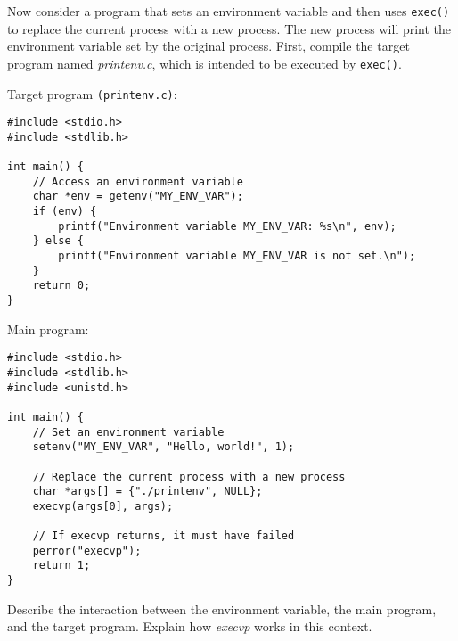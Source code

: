 \documentclass{dcbl/challenge}
\begin{document}
\begin{aufgabe}
Now consider a program that sets an environment variable and then uses \texttt{exec()} to replace the current process with a new process. The new process will print the environment variable set by the original process. First, compile the target program named \textit{printenv.c}, which is intended to be executed by \texttt{exec()}. 

Target program \texttt{(printenv.c)}:

\begin{verbatim}
#include <stdio.h>
#include <stdlib.h>

int main() {
    // Access an environment variable
    char *env = getenv("MY_ENV_VAR");
    if (env) {
        printf("Environment variable MY_ENV_VAR: %s\n", env);
    } else {
        printf("Environment variable MY_ENV_VAR is not set.\n");
    }
    return 0;
}
\end{verbatim}

Main program:

\begin{verbatim}
#include <stdio.h>
#include <stdlib.h>
#include <unistd.h>

int main() {
    // Set an environment variable
    setenv("MY_ENV_VAR", "Hello, world!", 1);

    // Replace the current process with a new process
    char *args[] = {"./printenv", NULL};
    execvp(args[0], args);

    // If execvp returns, it must have failed
    perror("execvp");
    return 1;
}
\end{verbatim}

Describe the interaction between the environment variable, the main program, and the target program. Explain how \textit{execvp} works in this context.
\end{aufgabe}
\end{document}
